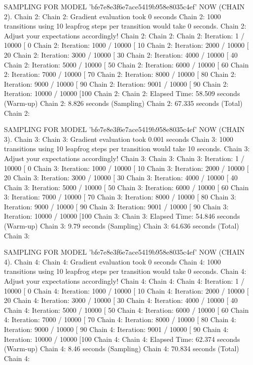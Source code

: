 \documentclass[
]{jss}
\begin{document}
\begin{CodeChunk}
\begin{CodeOutput}
SAMPLING FOR MODEL 'bfe7e8e3f6e7ace5419b958e8035c4ef' NOW (CHAIN 2).
Chain 2: 
Chain 2: Gradient evaluation took 0 seconds
Chain 2: 1000 transitions using 10 leapfrog steps per transition would take 0 seconds.
Chain 2: Adjust your expectations accordingly!
Chain 2: 
Chain 2: 
Chain 2: Iteration:    1 / 10000 [  0%
Chain 2: Iteration: 1000 / 10000 [ 10%
Chain 2: Iteration: 2000 / 10000 [ 20%
Chain 2: Iteration: 3000 / 10000 [ 30%
Chain 2: Iteration: 4000 / 10000 [ 40%
Chain 2: Iteration: 5000 / 10000 [ 50%
Chain 2: Iteration: 6000 / 10000 [ 60%
Chain 2: Iteration: 7000 / 10000 [ 70%
Chain 2: Iteration: 8000 / 10000 [ 80%
Chain 2: Iteration: 9000 / 10000 [ 90%
Chain 2: Iteration: 9001 / 10000 [ 90%
Chain 2: Iteration: 10000 / 10000 [100%
Chain 2: 
Chain 2:  Elapsed Time: 58.509 seconds (Warm-up)
Chain 2:                8.826 seconds (Sampling)
Chain 2:                67.335 seconds (Total)
Chain 2: 

SAMPLING FOR MODEL 'bfe7e8e3f6e7ace5419b958e8035c4ef' NOW (CHAIN 3).
Chain 3: 
Chain 3: Gradient evaluation took 0.001 seconds
Chain 3: 1000 transitions using 10 leapfrog steps per transition would take 10 seconds.
Chain 3: Adjust your expectations accordingly!
Chain 3: 
Chain 3: 
Chain 3: Iteration:    1 / 10000 [  0%
Chain 3: Iteration: 1000 / 10000 [ 10%
Chain 3: Iteration: 2000 / 10000 [ 20%
Chain 3: Iteration: 3000 / 10000 [ 30%
Chain 3: Iteration: 4000 / 10000 [ 40%
Chain 3: Iteration: 5000 / 10000 [ 50%
Chain 3: Iteration: 6000 / 10000 [ 60%
Chain 3: Iteration: 7000 / 10000 [ 70%
Chain 3: Iteration: 8000 / 10000 [ 80%
Chain 3: Iteration: 9000 / 10000 [ 90%
Chain 3: Iteration: 9001 / 10000 [ 90%
Chain 3: Iteration: 10000 / 10000 [100%
Chain 3: 
Chain 3:  Elapsed Time: 54.846 seconds (Warm-up)
Chain 3:                9.79 seconds (Sampling)
Chain 3:                64.636 seconds (Total)
Chain 3: 

SAMPLING FOR MODEL 'bfe7e8e3f6e7ace5419b958e8035c4ef' NOW (CHAIN 4).
Chain 4: 
Chain 4: Gradient evaluation took 0 seconds
Chain 4: 1000 transitions using 10 leapfrog steps per transition would take 0 seconds.
Chain 4: Adjust your expectations accordingly!
Chain 4: 
Chain 4: 
Chain 4: Iteration:    1 / 10000 [  0%
Chain 4: Iteration: 1000 / 10000 [ 10%
Chain 4: Iteration: 2000 / 10000 [ 20%
Chain 4: Iteration: 3000 / 10000 [ 30%
Chain 4: Iteration: 4000 / 10000 [ 40%
Chain 4: Iteration: 5000 / 10000 [ 50%
Chain 4: Iteration: 6000 / 10000 [ 60%
Chain 4: Iteration: 7000 / 10000 [ 70%
Chain 4: Iteration: 8000 / 10000 [ 80%
Chain 4: Iteration: 9000 / 10000 [ 90%
Chain 4: Iteration: 9001 / 10000 [ 90%
Chain 4: Iteration: 10000 / 10000 [100%
Chain 4: 
Chain 4:  Elapsed Time: 62.374 seconds (Warm-up)
Chain 4:                8.46 seconds (Sampling)
Chain 4:                70.834 seconds (Total)
Chain 4: 


\end{CodeOutput}
\end{CodeChunk}
\end{document}
